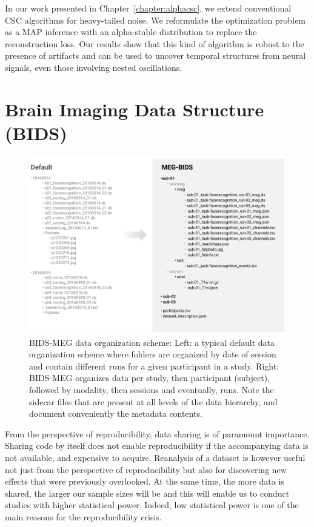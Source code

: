 In our work presented in Chapter~\ref{chapter:alphacsc}, we extend conventional \ac{CSC} algorithms for heavy-tailed noise. We reformulate the optimization problem as a \ac{MAP} inference with an alpha-stable distribution to replace the reconstruction loss. Our results show that this kind of algorithm is robust to the presence of artifacts and can be used to uncover temporal structures from neural signals, even those involving nested oscillations.

\section*{Brain Imaging Data Structure (BIDS)}

\begin{figure}[htb!]
\begin{center}
   \includegraphics[width=\linewidth]{figures/bids_organization.png}
\end{center}
   \caption[]{BIDS-MEG data organization scheme: Left: a typical default data organization scheme where folders are organized by date of session and contain different runs for a given participant in a study. Right: BIDS-MEG organizes data per study, then participant (subject), followed by modality, then sessions and eventually, runs. Note the sidecar files that are present at all levels of the data hierarchy, and document conveniently the metadata contents.}
   \label{fig:sommaire:BIDS-MEG-organization}
\end{figure}
From the perspective of reproducibility, data sharing is of paramount importance. Sharing code by itself does not enable reproducibility if the accompanying data is not available, and expensive to acquire. Reanalysis of a dataset is however useful not just from the perspective of reproducibility but also for discovering new effects that were previously overlooked. At the same time, the more data is shared, the larger our sample sizes will be and this will enable us to conduct studies with higher statistical power. Indeed, low statistical power is one of the main reasons for the reproducibility crisis.

